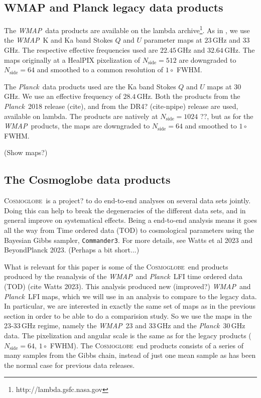 \documentclass[twocolumn]{../../common/aa}
\def\WMAP{\emph{WMAP}}
\def\Planck{\emph{Planck}}
\def\commanderthree{\texttt{Commander3}}
\newcommand{\cosmoglobe}{\textsc{Cosmoglobe}}
\newcommand{\Cosmoglobe}{\textsc{Cosmoglobe}}
\begin{document}
\subsection{WMAP and Planck legacy data products}
\label{sec:wmap_data}

The \WMAP\ data products are available on the lambda archive\footnote{http://lambda.gsfc.nasa.gov}. As in \citet{fuskeland2014}, we use the \WMAP\ K and Ka band Stokes $Q$ and $U$ parameter maps at $23$\,GHz and $33$\,GHz. The respective effective frequencies used are $22.45$\,GHz and $32.64$\,GHz. The maps originally at a HealPIX pixelization of $N_\textrm{side}=512$ are downgraded to $N_\textrm{side}=64$ and smoothed to a common resolution of $1\circ$ FWHM.

The \Planck\ data products used are the Ka band Stokes $Q$ and $U$ maps at $30$\,GHz. We use an effective frequency of $28.4$\,GHz. Both the products from the \Planck\ 2018 release (cite), and from the DR4? (cite-npipe) release are used, available on lambda. The products are natively at $N_\textrm{side}=1024$ ??, but as for the \WMAP\ products, the maps are downgraded to $N_\textrm{side}=64$ and smoothed to $1\circ$ FWHM.

(Show maps?)

\subsection{The Cosmoglobe data products}
\label{sec:cosmoglobe_data}

\Cosmoglobe\ is a project? to do end-to-end analyses on several data sets jointly. Doing this can help to break the degeneracies of the different data sets, and in general improve on systematical effects. Being a end-to-end analysis means it goes all the way from Time ordered data (TOD) to cosmological parameters using the Bayesian Gibbs sampler, \commanderthree. For more details, see Watts et al 2023 and BeyondPlanck 2023.
(Perhaps a bit short...)

What is relevant for this paper is some of the \cosmoglobe\ end products produced by the reanalysis of the \WMAP\ and \Planck\ LFI time ordered data (TOD) (cite Watts 2023). This analysis produced new (improved?) \WMAP\ and \Planck\ LFI maps, which we will use in an analysis to compare to the legacy data. In particular, we are interested in exactly the same set of maps as in the previous section in order to be able to do a comparision study. So we use the maps in the 23-33\,GHz regime, namely the \WMAP\ 23 and 33\,GHz and the \Planck\ 30\,GHz data. The pixelization and angular scale is the same as for the legacy products ($N_\textrm{side}=64$, $1\circ$ FWHM). The \cosmoglobe\ end products consists of a series of many samples from the Gibbs chain, instead of just one mean sample as has been the normal case for previous data releases.
\end{document}
